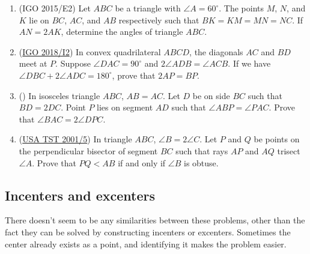 \documentclass[11pt,paper=letter]{scrartcl}
\begin{document}
\begin{enumerate}
  \item (IGO 2015/E2) Let $ABC$ be a triangle with $\angle A = 60^{\circ}$. The points $M$, $N$, and $K$ lie on $BC$, $AC$, and $AB$ respectively such that $BK = KM = MN = NC$. If $AN = 2AK$, determine the angles of triangle $ABC$.

  \item (\href{https://aops.com/community/c6h1710019}{IGO 2018/I2}) In convex quadrilateral $ABCD$, the diagonals $AC$ and $BD$ meet at $P$. Suppose $\angle DAC = 90^{\circ}$ and $2\angle ADB = \angle ACB$. If we have $\angle DBC + 2\angle ADC = 180^{\circ}$, prove that $2AP = BP$.

  \item (\cite{D}) In isosceles triangle $ABC$, $AB = AC$. Let $D$ be on side $BC$ such that $BD = 2DC$. Point $P$ lies on segment $AD$ such that $\angle ABP = \angle PAC$. Prove that $\angle BAC = 2\angle DPC$.

  \item (\href{https://aops.com/community/c6h61956}{USA TST 2001/5}) In triangle $ABC$, $\angle B = 2\angle C$. Let $P$ and $Q$ be points on the perpendicular bisector of segment $BC$ such that rays $AP$ and $AQ$ trisect $\angle A$. Prove that $PQ < AB$ if and only if $\angle B$ is obtuse.
\end{enumerate}

\subsection{Incenters and excenters}

There doesn't seem to be any similarities between these problems, other than the fact they can be solved by constructing incenters or excenters. Sometimes the center already exists as a point, and identifying it makes the problem easier.
\end{document}
